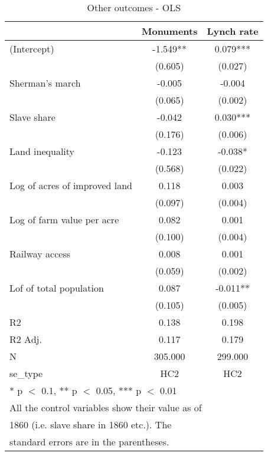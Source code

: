 \begin{table}

\caption{\label{tab:}Other outcomes - OLS}
\centering
\begin{tabular}[t]{lcc}
\toprule
  & Monuments & Lynch rate\\
\midrule
(Intercept) & -1.549** & 0.079***\\
 & (0.605) & (0.027)\\
Sherman's march & -0.005 & -0.004\\
 & (0.065) & (0.002)\\
Slave share & -0.042 & 0.030***\\
 & (0.176) & (0.006)\\
Land inequality & -0.123 & -0.038*\\
 & (0.568) & (0.022)\\
Log of acres of improved land & 0.118 & 0.003\\
 & (0.097) & (0.004)\\
Log of farm value per acre & 0.082 & 0.001\\
 & (0.100) & (0.004)\\
Railway access & 0.008 & 0.001\\
 & (0.059) & (0.002)\\
Lof of total population & 0.087 & -0.011**\\
 & (0.105) & (0.005)\\
\midrule
R2 & 0.138 & 0.198\\
R2 Adj. & 0.117 & 0.179\\
N & 305.000 & 299.000\\
se\_type & HC2 & HC2\\
\bottomrule
\multicolumn{3}{l}{\textsuperscript{} * p $<$ 0.1, ** p $<$ 0.05, *** p $<$ 0.01}\\
\multicolumn{3}{l}{\textsuperscript{} All the control variables show their value as of}\\
\multicolumn{3}{l}{1860 (i.e. slave share in 1860 etc.). The}\\
\multicolumn{3}{l}{standard errors are in the parentheses.}\\
\end{tabular}
\end{table}
